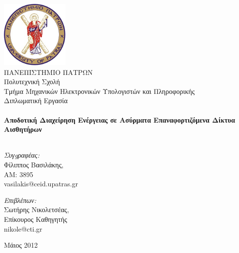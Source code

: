 
\begin{titlingpage}
\begin{center}

\includegraphics[width=0.25\textwidth]{upatras_logo.jpg}\\[1cm]

\HUGE 	ΠΑΝΕΠΙΣΤΗΜΙΟ ΠΑΤΡΩΝ\\
\LARGE	Πολυτεχνική Σχολή\\
\Huge	Τμήμα Μηχανικών Ηλεκτρονικών Υπολογιστών και Πληροφορικής\\[1.5cm]

\LARGE Διπλωματική Εργασία\\[0.1cm]


\HRule \\[0.4cm]
{ \HUGE \bfseries Αποδοτική Διαχείρηση Ενέργειας σε Ασύρματα Επαναφορτιζόμενα Δίκτυα Αισθητήρων}\\[0.4cm]

\HRule \\[0.5cm]

\begin{minipage}{0.4\textwidth}
\begin{flushleft} \large
\emph{Συγgραφέας:}\\
Φίλιππος Βασιλάκης, \\AM: 3895\\ vasilakis@ceid.upatras.gr
\end{flushleft}
\end{minipage}
\begin{minipage}{0.4\textwidth}
\begin{flushright} \large
\emph{Επιβλέπων:} \\
Σωτήρης Νικολετσέας, \\Επίκουρος Καθηγητής\\ nikole@cti.gr
\end{flushright}
\end{minipage}

\vfill

{\large Μάιος 2012}

\end{center}

\end{titlingpage}

